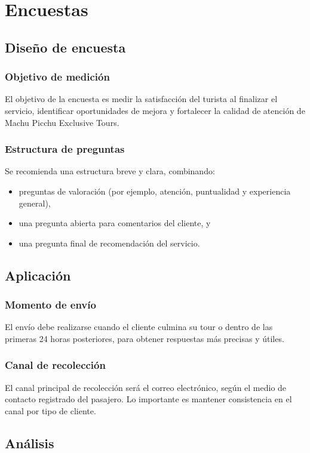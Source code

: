 \section{Encuestas}

\subsection{Diseño de encuesta}
\subsubsection{Objetivo de medición}
\noindent El objetivo de la encuesta es medir la satisfacción del turista al finalizar el servicio, identificar oportunidades de mejora y fortalecer la calidad de atención de Machu Picchu Exclusive Tours.
\subsubsection{Estructura de preguntas}
\noindent Se recomienda una estructura breve y clara, combinando:
\begin{itemize}
    \item preguntas de valoración (por ejemplo, atención, puntualidad y experiencia general),
    \item una pregunta abierta para comentarios del cliente, y
    \item una pregunta final de recomendación del servicio.
\end{itemize}

\subsection{Aplicación}
\subsubsection{Momento de envío}
\noindent El envío debe realizarse cuando el cliente culmina su tour o dentro de las primeras 24 horas posteriores, para obtener respuestas más precisas y útiles.
\subsubsection{Canal de recolección}
\noindent El canal principal de recolección será el correo electrónico, según el medio de contacto registrado del pasajero. Lo importante es mantener consistencia en el canal por tipo de cliente.

\subsection{Análisis}
